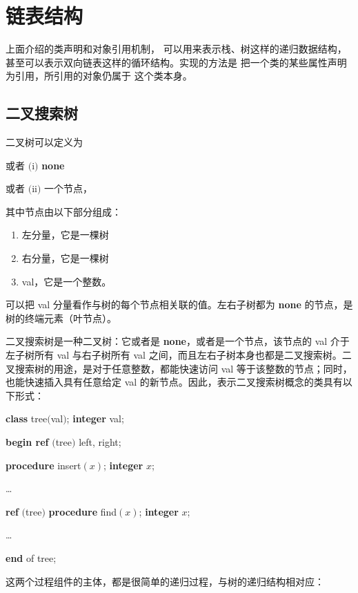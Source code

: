 \documentclass[twoside,11pt,fontset=none]{ctexbook}
\begin{document}
\section[链表结构]{链表结构}

上面介绍的类声明和对象引用机制，
可以用来表示栈、树这样的递归数据结构，
甚至可以表示双向链表这样的循环结构。实现的方法是
把一个类的某些属性声明为引用，所引用的对象仍属于
这个类本身。

\subsection{二叉搜索树}

二叉树可以定义为

\quad 或者 \tabto*{5.35em}$($i$)$ \tabto*{7.35em}\textbf{none}

\tabto*{4em}或者 $($ii$)$ 一个节点，

\noindent
其中节点由以下部分组成：

\begin{enumerate}[wide, nosep, label=(\alph*)]
	\item 左分量，它是一棵树
	\item 右分量，它是一棵树
	\item val，它是一个整数。
\end{enumerate}

\noindent
可以把 val 分量看作与树的每个节点相关联的值。左右子树都为 \textbf{none} 的节点，是树的终端元素（叶节点）。

二叉搜索树是一种二叉树：它或者是 \textbf{none}，或者是一个节点，该节点的 val 介于左子树所有 val 与右子树所有 val 之间，而且左右子树本身也都是二叉搜索树。二叉搜索树的用途，是对于任意整数，都能快速访问 val 等于该整数的节点；同时，也能快速插入具有任意给定 val 的新节点。因此，表示二叉搜索树概念的类具有以下形式：

\quad \textbf{class} tree$($val$)$; \textbf{integer} val;

\quad \quad \textbf{begin ref} $($tree$)$ left, right;

\quad \quad \quad \textbf{procedure} insert$(x)$; \textbf{integer} $x$;

\quad \quad \quad \quad \dots

\quad \quad \quad \textbf{ref} $($tree$)$ \textbf{procedure} find$(x)$; \textbf{integer} $x$;

\quad \quad \quad \quad \dots

\quad \quad \textbf{end} of tree;

这两个过程组件的主体，都是很简单的递归过程，与树的递归结构相对应：
\end{document}
